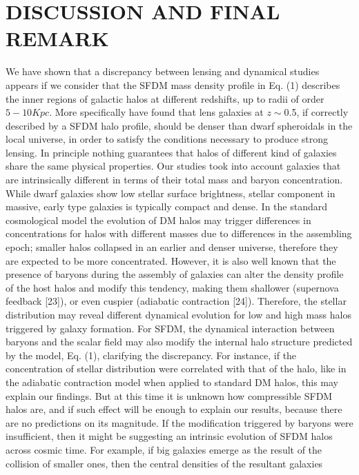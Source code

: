 \documentclass[9.5pt, twocolumn]{article}
\begin{document}
\section{\centering DISCUSSION AND FINAL REMARK}
We have shown that a discrepancy between lensing and
dynamical studies appears if we consider that the SFDM
mass density profile in Eq. (1) describes the inner regions
of galactic halos at different redshifts, up to radii of order
$5 - 10 Kpc.$ More  specifically have found that lens
galaxies at $z \sim $0.5, if correctly described by a SFDM halo
profile, should be denser than dwarf spheroidals in the
local universe, in order to satisfy the conditions necessary
to produce strong lensing.
In principle nothing guarantees that halos of different
kind of galaxies share the same physical properties.
Our studies took into account galaxies that are intrinsically
different in terms of their total mass and baryon
concentration. While dwarf galaxies show low stellar surface
brightness, stellar component in massive, early type
galaxies is typically compact and dense.
In the standard cosmological model the evolution of
DM halos may trigger differences in concentrations for
halos with different masses due to differences in the assembling
epoch; smaller halos collapsed in an earlier and
denser universe, therefore they are expected to be more
concentrated. However, it is also well known that the
presence of baryons during the assembly of galaxies can
alter the density profile of the host halos and modify
this tendency, making them shallower (supernova feedback
[23]), or even cuspier (adiabatic contraction [24]).
Therefore, the stellar distribution may reveal different
dynamical evolution for low and high mass halos triggered
by galaxy formation.
For SFDM, the dynamical interaction between baryons
and the scalar field may also modify the internal halo
structure predicted by the model, Eq. (1), clarifying the
discrepancy. For instance, if the concentration of stellar
distribution were correlated with that of the halo,
like in the adiabatic contraction model when applied to
standard DM halos, this may explain our findings. But
at this time it is unknown how compressible SFDM halos
are, and if such effect will be enough to explain our
results, because there are no predictions on its magnitude.
If the modification triggered by baryons were insufficient, then it might be suggesting an intrinsic evolution
of SFDM halos across cosmic time. For example, if big
galaxies emerge as the result of the collision of smaller
ones, then the central densities of the resultant galaxies
\end{document}
